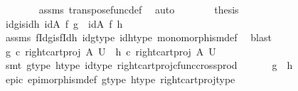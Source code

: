 \begin{isabellebody}
\ \ \ \ \ \ \isamarkupfalse%
\ assms{\isacharparenleft}{\kern0pt}{}{\isacharparenright}{\kern0pt}\ transpose{\isacharunderscore}{\kern0pt}func{\isacharunderscore}{\kern0pt}def\ \isamarkupfalse%
\ auto\isanewline
\ \ \ \ \isamarkupfalse%
\ \isamarkupfalse%
\ {\isacharquery}{\kern0pt}thesis\isacommand{{\isachardot}{\kern0pt}}\isamarkupfalse%
\ \ \ \isanewline
\ \ \ \isamarkupfalse%
\isanewline
\ \ \ \isamarkupfalse%
\ \isamarkupfalse%
\ idg{\isacharunderscore}{\kern0pt}is{\isacharunderscore}{\kern0pt}idh{\isacharcolon}{\kern0pt}\ {\isachardoublequoteopen}{\isacharparenleft}{\kern0pt}id{\isacharparenleft}{\kern0pt}A{\isacharparenright}{\kern0pt}\ {\isasymtimes}\isactrlsub f\ g{\isacharparenright}{\kern0pt}\ {\isacharequal}{\kern0pt}\ {\isacharparenleft}{\kern0pt}id{\isacharparenleft}{\kern0pt}A{\isacharparenright}{\kern0pt}\ {\isasymtimes}\isactrlsub f\ h{\isacharparenright}{\kern0pt}{\isachardoublequoteclose}\isanewline
\ \ \ \ \isamarkupfalse%
\ assms\ fIdg{\isacharunderscore}{\kern0pt}is{\isacharunderscore}{\kern0pt}fIdh\ idg{\isacharunderscore}{\kern0pt}type\ idh{\isacharunderscore}{\kern0pt}type\ monomorphism{\isacharunderscore}{\kern0pt}def{}\ \isamarkupfalse%
\ blast\isanewline
\ \ \ \isamarkupfalse%
\ \isamarkupfalse%
\ {\isachardoublequoteopen}g\ {\isasymcirc}\isactrlsub c\ {\isacharparenleft}{\kern0pt}right{\isacharunderscore}{\kern0pt}cart{\isacharunderscore}{\kern0pt}proj\ A\ U{\isacharparenright}{\kern0pt}\ {\isacharequal}{\kern0pt}\ h\ {\isasymcirc}\isactrlsub c\ {\isacharparenleft}{\kern0pt}right{\isacharunderscore}{\kern0pt}cart{\isacharunderscore}{\kern0pt}proj\ A\ U{\isacharparenright}{\kern0pt}{\isachardoublequoteclose}\isanewline
\ \ \ \ \isamarkupfalse%
\ {\isacharparenleft}{\kern0pt}smt\ g{\isacharunderscore}{\kern0pt}type{}\ h{\isacharunderscore}{\kern0pt}type{}\ id{\isacharunderscore}{\kern0pt}type\ right{\isacharunderscore}{\kern0pt}cart{\isacharunderscore}{\kern0pt}proj{\isacharunderscore}{\kern0pt}cfunc{\isacharunderscore}{\kern0pt}cross{\isacharunderscore}{\kern0pt}prod{\isacharparenright}{\kern0pt}\isanewline
\ \ \ \isamarkupfalse%
\ \isamarkupfalse%
\ {\isachardoublequoteopen}g\ {\isacharequal}{\kern0pt}\ h{\isachardoublequoteclose}\isanewline
\ \ \ \ \isamarkupfalse%
\ epic\ epimorphism{\isacharunderscore}{\kern0pt}def{}\ g{\isacharunderscore}{\kern0pt}type{}\ h{\isacharunderscore}{\kern0pt}type{}\ right{\isacharunderscore}{\kern0pt}cart{\isacharunderscore}{\kern0pt}proj{\isacharunderscore}{\kern0pt}type\ \isamarkupfalse%

\end{isabellebody}
